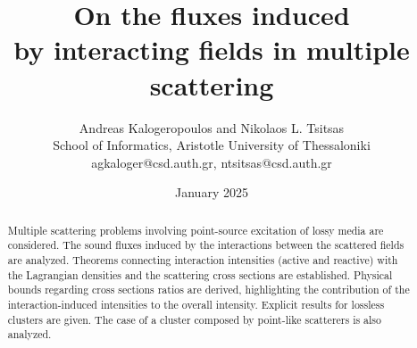 \documentclass{article}
\title{On the fluxes induced\\ by interacting fields in multiple scattering}
\author{Andreas Kalogeropoulos and Nikolaos L. Tsitsas\\
School of Informatics, Aristotle University of Thessaloniki\\
agkaloger@csd.auth.gr, ntsitsas@csd.auth.gr}
\date{January 2025}
\begin{document}
\maketitle









\begin{abstract}
\noindent Multiple scattering problems involving point-source excitation of lossy media are considered. The sound fluxes induced by the interactions between the scattered fields are analyzed. Theorems connecting interaction intensities (active and reactive) with the Lagrangian densities and the scattering cross sections are established. Physical bounds regarding cross sections ratios are derived, highlighting the contribution of the interaction-induced intensities to the overall intensity. Explicit results for lossless clusters are given. The case of a cluster composed by point-like scatterers is also analyzed.
\end{abstract}

\end{document}
